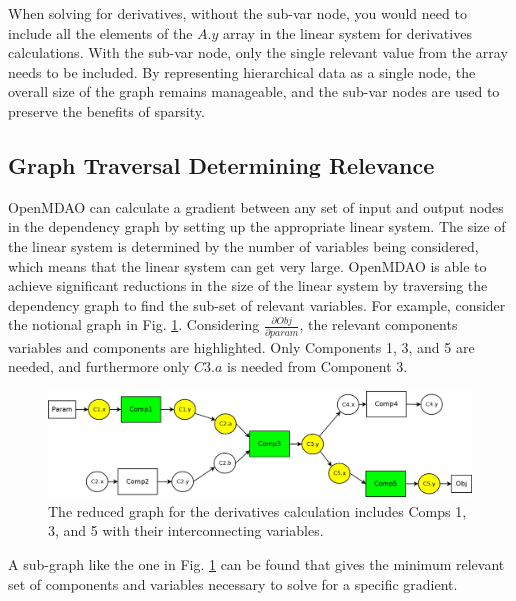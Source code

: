 \documentclass[]{aiaa-tc} %
\begin{document}
    When solving for derivatives, without the sub-var node, you would need to include all the 
    elements of the $A.y$ array in the linear system for derivatives calculations. 
    With the sub-var node, only the single relevant value from the array needs to be included. 
    By representing hierarchical data as a single node, the overall size of the graph 
    remains manageable, and the sub-var nodes are used to preserve the benefits of sparsity. 


    \subsection{Graph Traversal Determining Relevance}
        
        OpenMDAO can calculate a gradient between any set of input and output nodes in the
        dependency graph by setting up the appropriate linear system. The size of the linear system
        is determined by the number of variables being considered, which means that the linear 
        system can get very large. OpenMDAO is able to achieve significant reductions in the 
        size of the linear system by traversing the dependency graph to find the sub-set of relevant variables.
        For example, consider the notional graph in Fig. \ref{fig:graph2}. Considering $\frac{\partial Obj}{\partial param}$, 
        the relevant components variables and components are highlighted. Only Components 1, 3, and 5 are needed, 
        and furthermore only $C3.a$ is needed from Component 3. 

        \begin{figure}[!htb]\begin{center}
          \includegraphics[width=.8\textwidth]{images/Graph2}
          \caption{ The reduced graph for the derivatives calculation includes Comps 1, 3, 
          and 5 with their interconnecting variables. \label{fig:graph2}}
        \end{center}\end{figure}

        A sub-graph like the one in Fig. \ref{fig:graph2} can be found that gives
        the minimum relevant set of components and variables necessary to solve for a specific 
        gradient. 
        
\end{document}
